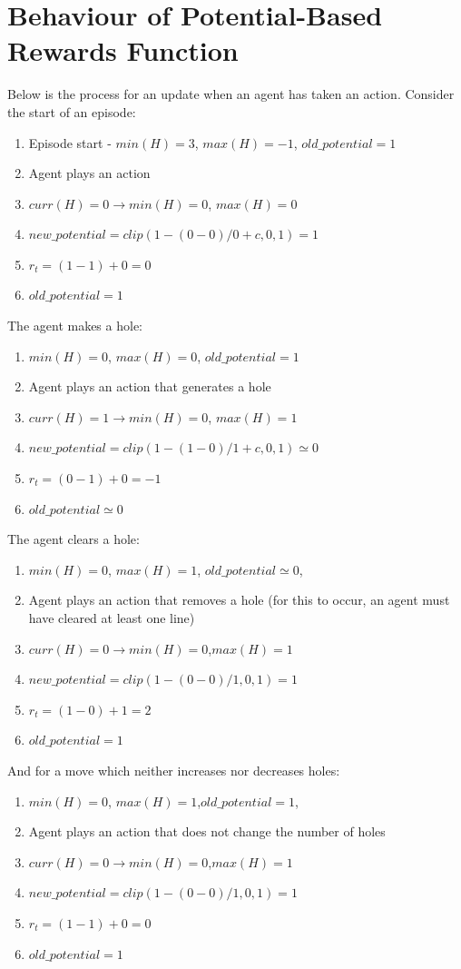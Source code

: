 \documentclass[12pt]{article}
\begin{document}
\section{Behaviour of Potential-Based Rewards Function}\label{behaviour}
Below is the process for an update when an agent has taken an action. Consider the start of an episode: 
\begin{enumerate}
    \item Episode start - $min(H)=3$, $max(H)=-1$, $old\_potential= 1$
    \item Agent plays an action
    \item $curr(H)=0 \rightarrow min(H) = 0$, $max(H)=0$
    \item $new\_potential = clip(1-(0-0)/0+c,0,1) = 1$
    \item $r_t = (1-1) + 0 = 0$
    \item $old\_potential = 1$
\end{enumerate}
The agent makes a hole:
\begin{enumerate}
    \item $min(H)=0$, $max(H)= 0$, $old\_potential= 1$
    \item Agent plays an action that generates a hole
    \item $curr(H)=1 \rightarrow min(H) = 0$, $max(H)=1$
    \item $new\_potential = clip(1-(1-0)/1+c,0,1) \simeq 0$
    \item $r_t = (0-1) + 0 = -1$
    \item $old\_potential \simeq 0$
\end{enumerate}
The agent clears a hole: 
\begin{enumerate}
    \item $min(H)=0$, $max(H)=1$, $old\_potential\simeq 0$,
    \item Agent plays an action that removes a hole (for this to occur, an agent must have cleared at least one line)
    \item $curr(H)=0 \rightarrow min(H)=0$,$max(H)=1$
    \item $new\_potential = clip(1-(0-0)/1,0,1) = 1$
    \item $r_t = (1-0)+1 = 2$
    \item $old\_potential = 1$
\end{enumerate}
And for a move which neither increases nor decreases holes: 
\begin{enumerate}
    \item $min(H)=0$, $max(H)=1$,$old\_potential=1$,
    \item Agent plays an action that does not change the number of holes
    \item $curr(H)=0 \rightarrow min(H)=0$,$max(H)=1$
    \item $new\_potential = clip(1-(0-0)/1,0,1) = 1$
    \item $r_t = (1-1)+0 = 0$
    \item $old\_potential = 1$
\end{enumerate}
\end{document}
